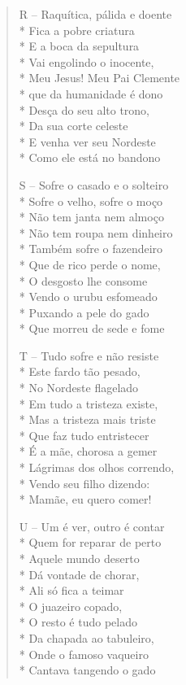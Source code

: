 \begin{verse}
R -- Raquítica, pálida e doente\\*
Fica a pobre criatura\\*
E a boca da sepultura\\*
Vai engolindo o inocente,\\*
Meu Jesus! Meu Pai Clemente\\*
que da humanidade é dono\\*
Desça do seu alto trono,\\*
Da sua corte celeste\\*
E venha ver seu Nordeste\\*
Como ele está no bandono

S -- Sofre o casado e o solteiro\\*
Sofre o velho, sofre o moço\\*
Não tem janta nem almoço\\*
Não tem roupa nem dinheiro\\*
Também sofre o fazendeiro\\*
Que de rico perde o nome,\\*
O desgosto lhe consome\\*
Vendo o urubu esfomeado\\*
Puxando a pele do gado\\*
Que morreu de sede e fome

T -- Tudo sofre e não resiste\\*
Este fardo tão pesado,\\*
No Nordeste flagelado\\*
Em tudo a tristeza existe,\\*
Mas a tristeza mais triste\\*
Que faz tudo entristecer\\*
É a mãe, chorosa a gemer\\*
Lágrimas dos olhos correndo,\\*
Vendo seu filho dizendo:\\*
Mamãe, eu quero comer!

U -- Um é ver, outro é contar\\*
Quem for reparar de perto\\*
Aquele mundo deserto\\*
Dá vontade de chorar,\\*
Ali só fica a teimar\\*
O juazeiro copado,\\*
O resto é tudo pelado\\*
Da chapada ao tabuleiro,\\*
Onde o famoso vaqueiro\\*
Cantava tangendo o gado


\end{verse}
